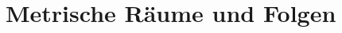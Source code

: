 \documentclass[../main.tex]{subfiles}
\begin{document}
\chapter{Metrische Räume und Folgen}
\end{document}
